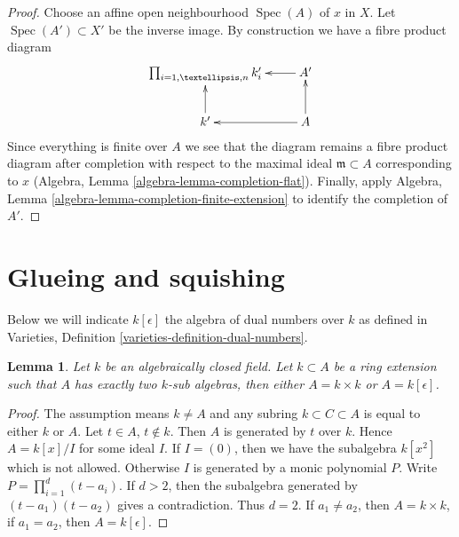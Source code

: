 \documentclass{stacks-project}
\theoremstyle{plain}
\newtheorem{lemma}[subsection]{Lemma}
\theoremstyle{definition}
\theoremstyle{remark}
\numberwithin{equation}{subsection}
\def\Spec{\mathop{\mathrm{Spec}}}
\begin{document}
\begin{proof}
Choose an affine open neighbourhood $\Spec(A)$ of $x$ in $X$.
Let $\Spec(A') \subset X'$ be the inverse image. By construction
we have a fibre product diagram
$$
\xymatrix{
\prod\nolimits_{i = 1, \ldots, n} k'_i &
A' \ar[l] \\
k' \ar[u] &
A \ar[u] \ar[l]
}
$$
Since everything is finite over $A$ we see that the diagram remains
a fibre product diagram after completion with respect to the
maximal ideal $\mathfrak m \subset A$ corresponding to $x$
(Algebra, Lemma \ref{algebra-lemma-completion-flat}).
Finally, apply Algebra, Lemma
\ref{algebra-lemma-completion-finite-extension}
to identify the completion of $A'$.
\end{proof}




\section{Glueing and squishing}
\label{section-glueing-squishing}

\noindent
Below we will indicate $k[\epsilon]$ the algebra of dual numbers
over $k$ as defined in
Varieties, Definition \ref{varieties-definition-dual-numbers}.

\begin{lemma}
\label{lemma-no-in-between-over-k}
Let $k$ be an algebraically closed field. Let $k \subset A$ be a ring
extension such that $A$ has exactly two $k$-sub algebras, then
either $A = k \times k$ or $A = k[\epsilon]$.
\end{lemma}

\begin{proof}
The assumption means $k \not = A$ and any subring $k \subset C \subset A$
is equal to either $k$ or $A$. Let $t \in A$, $t \not \in k$.
Then $A$ is generated by $t$ over $k$. Hence $A = k[x]/I$ for some
ideal $I$. If $I = (0)$, then we have the subalgebra $k[x^2]$
which is not allowed. Otherwise $I$ is generated by a monic polynomial $P$.
Write $P = \prod_{i = 1}^d (t - a_i)$. If $d > 2$, then the subalgebra
generated by $(t - a_1)(t - a_2)$ gives a contradiction.
Thus $d = 2$. If $a_1 \not = a_2$, then $A = k \times k$,
if $a_1 = a_2$, then $A = k[\epsilon]$.
\end{proof}
\end{document}
